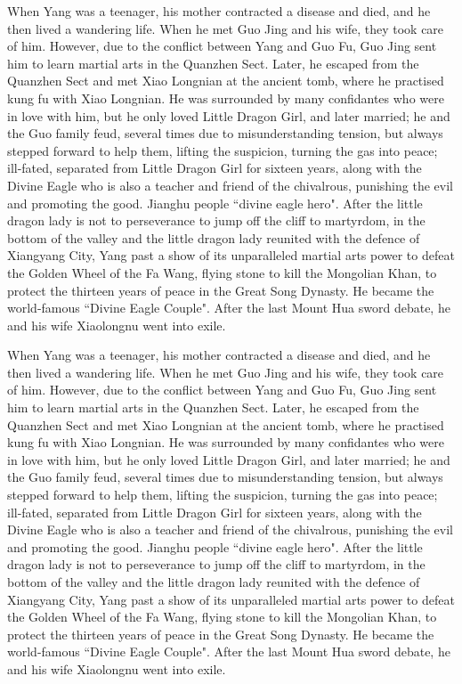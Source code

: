 \documentclass[print, doctor, vlined]{DissertUESTC}
\begin{document}
	When Yang was a teenager, his mother contracted a disease and died, and he then lived a wandering life. When he met Guo Jing and his wife, they took care of him. However, due to the conflict between Yang and Guo Fu, Guo Jing sent him to learn martial arts in the Quanzhen Sect. Later, he escaped from the Quanzhen Sect and met Xiao Longnian at the ancient tomb, where he practised kung fu with Xiao Longnian. He was surrounded by many confidantes who were in love with him, but he only loved Little Dragon Girl, and later married; he and the Guo family feud, several times due to misunderstanding tension, but always stepped forward to help them, lifting the suspicion, turning the gas into peace; ill-fated, separated from Little Dragon Girl for sixteen years, along with the Divine Eagle who is also a teacher and friend of the chivalrous, punishing the evil and promoting the good. Jianghu people ``divine eagle hero". After the little dragon lady is not to perseverance to jump off the cliff to martyrdom, in the bottom of the valley and the little dragon lady reunited with the defence of Xiangyang City, Yang past a show of its unparalleled martial arts power to defeat the Golden Wheel of the Fa Wang, flying stone to kill the Mongolian Khan, to protect the thirteen years of peace in the Great Song Dynasty. He became the world-famous ``Divine Eagle Couple". After the last Mount Hua sword debate, he and his wife Xiaolongnu went into exile.

	When Yang was a teenager, his mother contracted a disease and died, and he then lived a wandering life. When he met Guo Jing and his wife, they took care of him. However, due to the conflict between Yang and Guo Fu, Guo Jing sent him to learn martial arts in the Quanzhen Sect. Later, he escaped from the Quanzhen Sect and met Xiao Longnian at the ancient tomb, where he practised kung fu with Xiao Longnian. He was surrounded by many confidantes who were in love with him, but he only loved Little Dragon Girl, and later married; he and the Guo family feud, several times due to misunderstanding tension, but always stepped forward to help them, lifting the suspicion, turning the gas into peace; ill-fated, separated from Little Dragon Girl for sixteen years, along with the Divine Eagle who is also a teacher and friend of the chivalrous, punishing the evil and promoting the good. Jianghu people ``divine eagle hero". After the little dragon lady is not to perseverance to jump off the cliff to martyrdom, in the bottom of the valley and the little dragon lady reunited with the defence of Xiangyang City, Yang past a show of its unparalleled martial arts power to defeat the Golden Wheel of the Fa Wang, flying stone to kill the Mongolian Khan, to protect the thirteen years of peace in the Great Song Dynasty. He became the world-famous ``Divine Eagle Couple". After the last Mount Hua sword debate, he and his wife Xiaolongnu went into exile.
	
\end{document}
